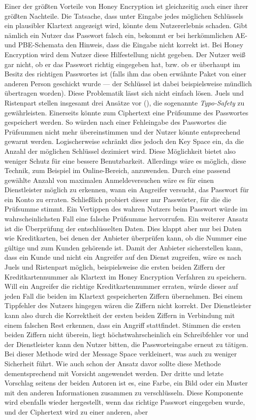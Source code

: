Einer der größten Vorteile von Honey Encryption ist gleichzeitig auch einer ihrer größten Nachteile. Die Tatsache, dass unter Eingabe jedes möglichen Schlüssels ein plausibler Klartext angezeigt wird, könnte dem Nutzererlebnis schaden. Gibt nämlich ein Nutzer das Passwort falsch ein, bekommt er bei herkömmlichen AE- und PBE-Schemata den Hinweis, dass die Eingabe nicht korrekt ist. Bei Honey Encryption wird dem Nutzer diese Hilfestellung nicht gegeben. Der Nutzer weiß gar nicht, ob er das Passwort richtig eingegeben hat, bzw. ob er überhaupt im Besitz des richtigen Passwortes ist (falls ihm das oben erwähnte Paket von einer anderen Person geschickt wurde --- der Schlüssel ist dabei beispielsweise mündlich übertragen worden). Diese Problematik lässt sich nicht einfach lösen. Juels und Ristenpart stellen insgesamt drei Ansätze vor (\cite{CRCS2014, EURO2014}), die sogenannte \emph{Typo-Safety} zu gewährleisten. Einerseits könnte zum Ciphertext eine Prüfsumme des Passwortes gespeichert werden. So würden nach einer Fehleingabe des Passwortes die Prüfsummen nicht mehr übereinstimmen und der Nutzer könnte entsprechend gewarnt werden. Logischerweise schränkt dies jedoch den Key Space ein, da die Anzahl der möglichen Schlüssel dezimiert wird. Diese Möglichkeit bietet also weniger Schutz für eine bessere Benutzbarkeit. Allerdings wäre es möglich, diese Technik, zum Beispiel im Online-Bereich, anzuwenden. Durch eine passend gewählte Anzahl von maximalen Anmeldeversuchen wäre es für einen Dienstleister möglich zu erkennen, wann ein Angreifer versucht, das Passwort für ein Konto zu erraten. Schließlich probiert dieser nur Passwörter, für die die Prüfsumme stimmt. Ein Vertippen des wahren Nutzers beim Passwort würde im wahrscheinlichsten Fall eine falsche Prüfsumme hervorrufen. Ein weiterer Ansatz ist die Überprüfung der entschlüsselten Daten. Dies klappt aber nur bei Daten wie Kreditkarten, bei denen der Anbieter überprüfen kann, ob die Nummer eine gültige und zum Kunden gehörende ist. Damit der Anbieter sicherstellen kann, dass ein Kunde und nicht ein Angreifer auf den Dienst zugreifen, wäre es nach Juels und Ristenpart möglich, beispielsweise die ersten beiden Ziffern der Kreditkartennummer als Klartext im Honey Encryption Verfahren zu speichern. Will ein Angreifer die richtige Kreditkartennummer erraten, würde dieser auf jeden Fall die beiden im Klartext gespeicherten Ziffern übernehmen. Bei einem Tippfehler des Nutzers hingegen wären die Ziffern nicht korrekt. Der Dienstleister kann also durch die Korrektheit der ersten beiden Ziffern in Verbindung mit einem falschen Rest erkennen, dass ein Angriff stattfindet. Stimmen die ersten beiden Ziffern nicht überein, liegt höchstwahrscheinlich ein Schreibfehler vor und der Dienstleister kann den Nutzer bitten, die Passworteingabe erneut zu tätigen. Bei dieser Methode wird der Message Space verkleinert, was auch zu weniger Sicherheit führt. Wie auch schon der Ansatz davor sollte diese Methode dementsprechend mit Vorsicht angewendet werden. Der dritte und letzte Vorschlag seitens der beiden Autoren ist es, eine Farbe, ein Bild oder ein Muster mit den anderen Informationen zusammen zu verschlüsseln. Diese Komponente wird ebenfalls wieder hergestellt, wenn das richtige Passwort eingegeben wurde, und der Ciphertext wird zu einer anderen, aber 